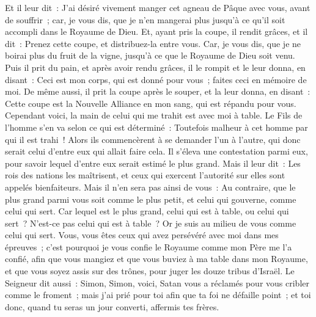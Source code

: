 \begin{multicols}{2}
Et il leur dit~: J'ai désiré vivement manger cet agneau de Pâque avec vous, avant de souffrir~;
car, je vous dis, que je n'en mangerai plus jusqu'à ce qu'il soit accompli dans le Royaume de Dieu.
Et, ayant pris la coupe, il rendit grâces, et il dit~: Prenez cette coupe, et distribuez-la entre vous.
Car, je vous dis, que je ne boirai plus du fruit de la vigne, jusqu'à ce que le Royaume de Dieu soit venu.
Puis il prit du pain, et après avoir rendu grâces, il le rompit et le leur donna, en disant~: Ceci est mon corps, qui est donné pour vous~; faites ceci en mémoire de moi.
De même aussi, il prit la coupe après le souper, et la leur donna, en disant~: Cette coupe est la Nouvelle Alliance en mon sang, qui est répandu pour vous.
Cependant voici, la main de celui qui me trahit est avec moi à table.
Le Fils de l'homme s'en va selon ce qui est déterminé~: Toutefois malheur à cet homme par qui il est trahi~!
Alors ils commencèrent à se demander l'un à l'autre, qui donc serait celui d'entre eux qui allait faire cela.
Il s'éleva une contestation parmi eux, pour savoir lequel d'entre eux serait estimé le plus grand.
Mais il leur dit~: Les rois des nations les maîtrisent, et ceux qui exercent l'autorité sur elles sont appelés bienfaiteurs.
Mais il n'en sera pas ainsi de vous~: Au contraire, que le plus grand parmi vous soit comme le plus petit, et celui qui gouverne, comme celui qui sert.
Car lequel est le plus grand, celui qui est à table, ou celui qui sert~? N'est-ce pas celui qui est à table~? Or je suis au milieu de vous comme celui qui sert.
Vous, vous êtes ceux qui avez persévéré avec moi dans mes épreuves~;
c'est pourquoi je vous confie le Royaume comme mon Père me l'a confié,
afin que vous mangiez et que vous buviez à ma table dans mon Royaume, et que vous soyez assis sur des trônes, pour juger les douze tribus d'Israël.
Le Seigneur dit aussi~: Simon, Simon, voici, Satan vous a réclamés pour vous cribler comme le froment~;
mais j'ai prié pour toi afin que ta foi ne défaille point~; et toi donc, quand tu seras un jour converti, affermis tes frères.

\end{multicols}
